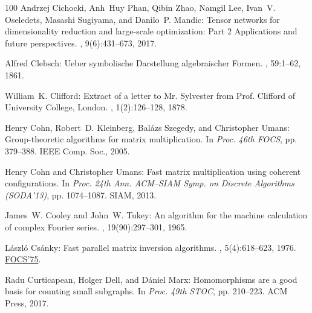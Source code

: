 \begin{thebibliography}{100}
{\sc Andrzej Cichocki, Anh~Huy Phan, Qibin Zhao, Namgil Lee, Ivan~V. Oseledets,
  Masashi Sugiyama, and Danilo~P. Mandic}: Tensor networks for dimensionality
  reduction and large-scale optimization: Part 2 {A}pplications and future
  perspectives.
, 9(6):431--673, 2017.

{\sc Alfred Clebsch}: Ueber symbolische {D}arstellung algebraischer {F}ormen.
, 59:1--62, 1861.

{\sc William~K. Clifford}: Extract of a letter to {M}r. {S}ylvester from
  {P}rof. {C}lifford of {U}niversity {C}ollege, {L}ondon.
, 1(2):126--128, 1878.
\newblock [\epfmtdoi{10.2307/2369303}]

{\sc Henry Cohn, Robert~D. Kleinberg, Bal{\'{a}}zs Szegedy, and Christopher
  Umans}: Group-theoretic algorithms for matrix multiplication.
\newblock In {\em Proc. 46th FOCS}, pp. 379--388. IEEE Comp. Soc., 2005.

{\sc Henry Cohn and Christopher Umans}: Fast matrix multiplication using
  coherent configurations.
\newblock In {\em Proc. 24th Ann. ACM--SIAM Symp. on Discrete Algorithms
  (SODA'13)}, pp. 1074--1087. SIAM, 2013.

{\sc James~W. Cooley and John~W. Tukey}: An algorithm for the machine
  calculation of complex {F}ourier series.
, 19(90):297--301, 1965.
\newblock [\epfmtdoi{10.1090/S0025-5718-1965-0178586-1}]

{\sc L\'aszl\'o Cs\'anky}: Fast parallel matrix inversion algorithms.
, 5(4):618--623, 1976.
\newblock \prelim \href{https://doi.org/10.1109/SFCS.1975.14}{FOCS'75}.
\newblock [\epfmtdoi{10.1137/0205040}]

{\sc Radu Curticapean, Holger Dell, and D{\'{a}}niel Marx}: Homomorphisms are a
  good basis for counting small subgraphs.
\newblock In {\em Proc. 49th STOC}, pp. 210--223. ACM Press, 2017.


\end{thebibliography}
